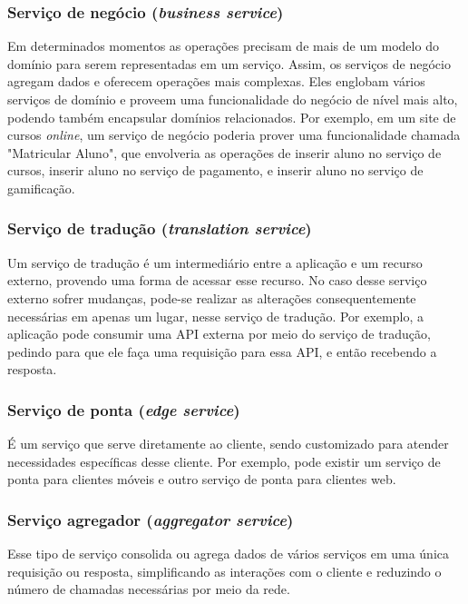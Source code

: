 \subsubsection{Serviço de negócio (\emph{business service})}
Em determinados momentos as operações precisam de mais de um modelo do domínio para serem representadas em um serviço. Assim, os serviços de negócio agregam dados e oferecem operações mais complexas. Eles englobam vários serviços de domínio e proveem uma funcionalidade do negócio de nível mais alto, podendo também encapsular domínios relacionados. Por exemplo, em um site de cursos \emph{online}, um serviço de negócio poderia prover uma funcionalidade chamada "Matricular Aluno", que envolveria as operações de inserir aluno no serviço de cursos, inserir aluno no serviço de pagamento, e inserir aluno no serviço de gamificação.

\subsubsection{Serviço de tradução (\emph{translation service})}
Um serviço de tradução é um intermediário entre a aplicação e um recurso externo, provendo uma forma de acessar esse recurso. No caso desse serviço externo sofrer mudanças, pode-se realizar as alterações consequentemente necessárias em apenas um lugar, nesse serviço de tradução. Por exemplo, a aplicação pode consumir uma API externa por meio do serviço de tradução, pedindo para que ele faça uma requisição para essa API, e então recebendo a resposta. %

\subsubsection{Serviço de ponta (\emph{edge service})}
É um serviço que serve diretamente ao cliente, sendo customizado para atender necessidades específicas desse cliente. Por exemplo, pode existir um serviço de ponta para clientes móveis e outro serviço de ponta para clientes web.

\subsubsection{Serviço agregador (\emph{aggregator service})}
Esse tipo de serviço consolida ou agrega dados de vários serviços em uma única requisição ou resposta, simplificando as interações com o cliente e reduzindo o número de chamadas necessárias por meio da rede. 
